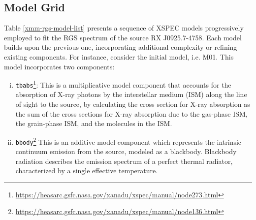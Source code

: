 		\subsection{Model Grid} \label{hi-resolution:models:grid}
			Table \ref{xmm-rgs-model-list} presents a sequence of XSPEC models progressively employed to fit the RGS spectrum of the source RX J0925.7-4758. Each model builds upon the previous one, incorporating additional complexity or refining existing components. For instance, consider the initial model, i.e. M01. This model incorporates two components:
			\begin{enumerate}[i.]
				\item \texttt{tbabs}\footnote{\url{https://heasarc.gsfc.nasa.gov/xanadu/xspec/manual/node273.html}}: This is a multiplicative model component that accounts for the absorption of X-ray photons by the interstellar medium (ISM) along the line of sight to the source, by calculating the cross section for X-ray absorption as the sum of the cross sections for X-ray absorption due to the gas-phase ISM, the grain-phase ISM, and the molecules in the ISM.
				
				\item \texttt{bbody}\footnote{\url{https://heasarc.gsfc.nasa.gov/xanadu/xspec/manual/node136.html}} This is an additive model component which represents the intrinsic continuum emission from the source, modeled as a blackbody. Blackbody radiation describes the emission spectrum of a perfect thermal radiator, characterized by a single effective temperature.
			\end{enumerate}
			
